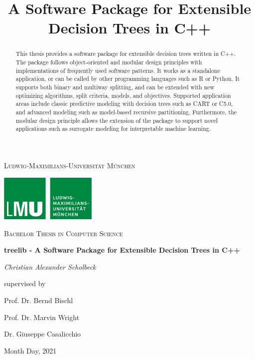 \documentclass[a4paper, 11pt]{article}
\begin{document}
\title{A Software Package for Extensible Decision Trees in C++}

\begin{titlepage}
	\centering
	\vspace{1cm}
	{\scshape\LARGE Ludwig-Maximilians-Universität München \par}
	\vspace{1.5cm}
	\includegraphics[width=0.35\textwidth]{figure/lmu_logo.png}\par\vspace{1cm}
	\vspace{0.5cm}
	{\scshape\Large Bachelor Thesis in Computer Science\par}
	\vspace{1.5cm}
	{\huge\bfseries treelib - A Software Package for Extensible Decision Trees in C++\par}
	\vspace{2cm}
	{\Large\itshape Christian Alexander Scholbeck\par}
	\vfill
	supervised by\par
	Prof. Dr. Bernd Bischl \par
	Prof. Dr. Marvin Wright \par
	Dr. Giuseppe Casalicchio

	\vfill

	{\large Month Day, 2021 \par}
\end{titlepage}

\newpage
\thispagestyle{empty}

\vspace*{4cm}
\begin{abstract}
This thesis provides a software package for extensible decision trees written in C++. The package follows object-oriented and modular design principles with implementations of frequently used software patterns. It works as a standalone application, or can be called by other programming languages such as R or Python. It supports both binary and multiway splitting, and can be extended with new optimizing algorithms, split criteria, models, and objectives. Supported application areas include classic predictive modeling with decision trees such as CART or C5.0, and advanced modeling such as model-based recursive partitioning. Furthermore, the modular design principle allows the extension of the package to support novel applications such as surrogate modeling for interpretable machine learning.

\end{abstract}
\vspace{2cm}
\tableofcontents
\clearpage
\setcounter{page}{1}
\end{document}

